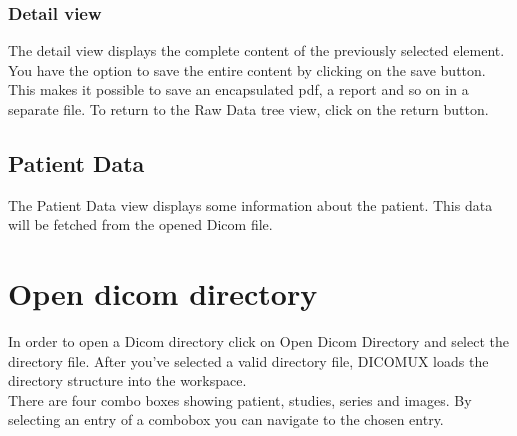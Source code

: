 		\begin{minipage}{\textwidth} 
		\centering
		\label{fig:bild}
		\end{minipage}
		
		\subsubsection{Detail view}
			The detail view displays the complete content of the previously selected element. You have the
			option to save the entire content by clicking on the save button. This makes it
			possible to save an encapsulated pdf, a report and so on in a separate file.
			To return to the Raw Data tree view, click on the return button.\\
		
			\begin{minipage}{\textwidth} 
			\centering
			\label{fig:bild}
			\end{minipage}
		
	\subsection{Patient Data}
		The Patient Data view displays some information about the patient. This data will be fetched from 				the opened Dicom file.\\
	
		\begin{minipage}{\textwidth} 
		\centering
		\label{fig:bild}
		\end{minipage}
	
\section{Open dicom directory}
	In order to open a Dicom directory click on Open Dicom Directory and select the directory
	file. After you've selected a valid directory file, DICOMUX loads the directory
	structure into the workspace.\\
	There are four combo boxes showing patient, studies, series and images. By
	selecting an entry of a combobox you can navigate to the chosen entry.\\

	\begin{minipage}{\textwidth} 
	\centering
	\label{fig:bild}
	\end{minipage}

